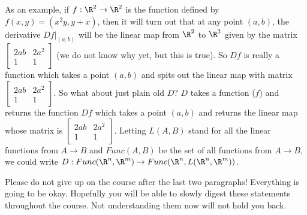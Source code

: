 \documentclass{ximera}
\begin{document}
As an example, if $f:\R^2 \to \R^2$ is the function defined by $f(x,y) = (x^2y,y+x)$, then it will turn out that at any point $(a,b)$,
 the derivative $Df\big|_{(a,b)}$ will be the linear map from $\R^2$ to $\R^3$ given by the matrix 
 $\begin{bmatrix}2ab & 2a^2\\ 1 & 1\end{bmatrix}$ (we do not know why yet, but this is true).  So $Df$ is really a 
 function which takes a point $(a,b)$ and spits out the linear map with matrix $\begin{bmatrix}2ab & 2a^2\\ 1 & 1\end{bmatrix}$. 
  So what about just plain old $D$?  $D$ takes a function ($f$) and returns the function $Df$ which takes a point $(a,b)$ and returns the linear map
  whose matrix is $\begin{bmatrix}2ab & 2a^2\\ 1 & 1\end{bmatrix}$.  Letting $L(A,B)$ stand for all the linear functions from 
  $A\to B$ and $Func(A,B)$ be the set of all functions from $A \to B$, we could write $D: Func(\R^n,\R^m) \to Func(\R^n,L(\R^n,\R^m))$.
  
  Please do not give up on the course after the last two paragraphs!  Everything is going to be okay.  Hopefully you will be able to slowly digest these statements 
  throughout the course.  Not understanding them now will not hold you back.
\end{document}
